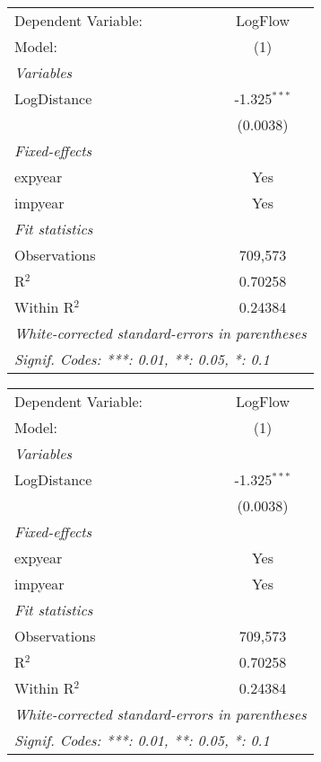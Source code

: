 \begin{tabular}{lc}
\tabularnewline\toprule\toprule
Dependent Variable:&LogFlow\\
Model:&(1)\\
\midrule
\emph{Variables}&  \\
LogDistance&-1.325$^{***}$\\
  &(0.0038)\\
\midrule
\emph{Fixed-effects}&  \\
expyear&Yes\\
impyear&Yes\\
\midrule
\emph{Fit statistics}&  \\
Observations& 709,573\\
R$^2$ & 0.70258\\
Within R$^2$ & 0.24384\\
\bottomrule\bottomrule
\multicolumn{2}{l}{\emph{White-corrected standard-errors in parentheses}}\\
\multicolumn{2}{l}{\emph{Signif. Codes: ***: 0.01, **: 0.05, *: 0.1}}\\
\end{tabular}
\begin{tabular}{lc}
\tabularnewline\toprule\toprule
Dependent Variable:&LogFlow\\
Model:&(1)\\
\midrule
\emph{Variables}&  \\
LogDistance&-1.325$^{***}$\\
  &(0.0038)\\
\midrule
\emph{Fixed-effects}&  \\
expyear&Yes\\
impyear&Yes\\
\midrule
\emph{Fit statistics}&  \\
Observations& 709,573\\
R$^2$ & 0.70258\\
Within R$^2$ & 0.24384\\
\bottomrule\bottomrule
\multicolumn{2}{l}{\emph{White-corrected standard-errors in parentheses}}\\
\multicolumn{2}{l}{\emph{Signif. Codes: ***: 0.01, **: 0.05, *: 0.1}}\\
\end{tabular}
